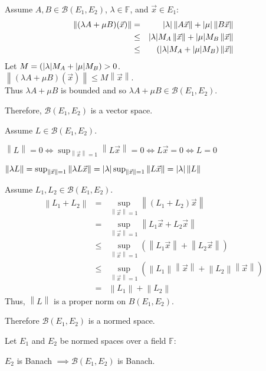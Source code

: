 \documentclass[letterpaper,12pt,fleqn]{article}
\newcommand{\vx}{\vec{x}}
\newcommand{\norm}[1]{\left\|#1\right\|}
\renewcommand{\b}{\beta}
\renewcommand{\l}{\lambda}
\renewcommand{\u}{\mu}
\renewcommand{\b}{\mathcal{B}}
\newcommand{\F}{\mathbb{F}}
\begin{document}
\begin{theproof}
  Assume $A,B\in\b(E_1,E_2)$, $\l\in\F$, and $\vx\in E_1$:
  \begin{eqnarray*}
    \norm{(\l A+\u B)(\vx)} &=& \abs{\l}\norm{A\vx}+\abs{\u}\norm{B\vx} \\
    &\le& \abs{\l}M_A\norm{\vx}+\abs{\u}M_B\norm{\vx} \\
    &\le& (\abs{\l}M_A+\abs{\u}M_B)\norm{\vx}
  \end{eqnarray*}
  Let $M=(\abs{\l}M_A+\abs{\u}M_B)>0$. \\
  $\norm{(\l A+\u B)(\vx)}\le M\norm{\vx}$. \\
  Thus $\l A+\u B$ is bounded and so $\l A+\u B\in\b(E_1,E_2)$.

  Therefore, $\b(E_1,E_2)$ is a vector space.

  Assume $L\in\b(E_1,E_2)$.

  $\norm{L}=0\iff\sup_{\norm{\vx}=1}\norm{L\vx}=0\iff L\vx=0\iff L=0$

  $\norm{\l L}=\sup_{\norm{\vx}=1}\norm{\l L\vx}=
  \abs{\l}\sup_{\norm{\vx}=1}\norm{L\vx}=\abs{\l}\norm{L}$

  Assume $L_1,L_2\in \b(E_1,E_2)$.
  \begin{eqnarray*}
    \norm{L_1+L_2} &=& \sup_{\norm{\vx}=1}\norm{(L_1+L_2)\vx} \\
    &=& \sup_{\norm{\vx}=1}\norm{L_1\vx+L_2\vx} \\
    &\le& \sup_{\norm{\vx}=1}(\norm{L_1\vx}+\norm{L_2\vx}) \\
    &\le& \sup_{\norm{\vx}=1}(\norm{L_1}\norm{\vx}+\norm{L_2}\norm\vx) \\
    &=& \norm{L_1}+\norm{L_2}
  \end{eqnarray*}
  Thus, $\norm{L}$ is a proper norm on $B(E_1,E_2)$.
  
  Therefore $\b(E_1,E_2)$ is a normed space.
\end{theproof}

\begin{theorem}
  Let $E_1$ and $E_2$ be normed spaces over a field $\F$:

  \qquad $E_2$ is Banach $\implies\b(E_1,E_2)$ is Banach.
\end{theorem}
\end{document}
